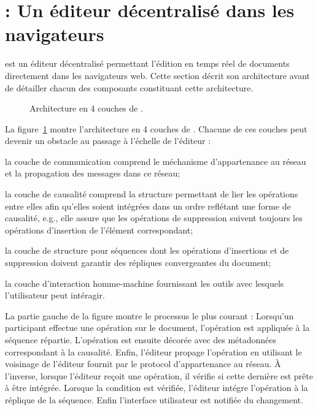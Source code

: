 
\section{\CRATE : Un éditeur décentralisé dans les navigateurs}
\label{editor:sec:crate}

\CRATE est un éditeur décentralisé permettant l'édition en temps réel de
documents directement dans les navigateurs web. Cette section décrit son
architecture avant de détailler chacun des composants constituant cette
architecture.


\begin{figure}
  \begin{center}
    
    \caption[Architecture de \CRATE]
    {\label{editor:fig:architecture}Architecture en 4 couches de \CRATE.}
  \end{center}
\end{figure}

La figure~\ref{editor:fig:architecture} montre l'architecture en 4 couches de
\CRATE. Chacune de ces couches peut devenir un obstacle au passage à l'échelle
de l'éditeur :
\begin{inparaenum}[(i)]
\item la couche de communication comprend le méchanisme d'appartenance au réseau
  et la propagation des messages dans ce réseau;
\item la couche de causalité comprend la structure permettant de lier les
  opérations entre elles afin qu'elles soient intégrées dans un ordre reflétant
  une forme de causalité, e.g., elle assure que les opérations de suppression
  suivent toujours les opérations d'insertion de l'élément correspondant;
\item la couche de structure pour séquences dont les opérations d'insertions et
  de suppression doivent garantir des répliques convergeantes du document;
\item la couche d'interaction homme-machine fournissant les outils avec lesquels
  l'utilisateur peut intéragir.
\end{inparaenum}

La partie gauche de la figure montre le processus le plus courant : Lorsqu'un
participant effectue une opération sur le document, l'opération est appliquée à
la séquence répartie. L'opération est ensuite décorée avec des métadonnées
correspondant à la causalité. Enfin, l'éditeur propage l'opération en utilisant
le voisinage de l'éditeur fournit par le protocol d'appartenance au réseau.  À
l'inverse, lorsque l'éditeur reçoit une opération, il vérifie si cette dernière
est prête à être intégrée. Lorsque la condition est vérifiée, l'éditeur intégre
l'opération à la réplique de la séquence. Enfin l'interface utilisateur est
notifiée du changement.

